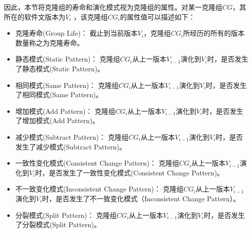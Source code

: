 因此，本节将克隆组的寿命和演化模式视为克隆组的属性。对某一克隆组$CG$，其所在的软件文版本为$V_i $ ，该克隆组{$CG_i$}的属性值可以描述如下：

\begin{itemize}
\item
克隆寿命(Group Life)：
截止到当前版本$V_ i $，克隆组$CG_i$所经历的所有的版本数量称之为克隆寿命。
\item
静态模式(Static Pattern)：
克隆组$CG_i$从上一版本$V_{i-1} $演化到$V_i $时，是否发生了静态模式(Static Pattern)。
\item
相同模式(Same Pattern)：
克隆组$CG_i$从上一版本$V_{i-1} $演化到$V_i $时，是否发生了相同模式(Same Pattern)。
\item
增加模式(Add Pattern)：
克隆组$CG_i$从上一版本$V_{i-1} $演化到$V_i $时，是否发生了增加模式(Add Pattern)。
\item
减少模式(Subtract Pattern)：
克隆组$CG_i$从上一版本$V_{i-1} $演化到$V_i $时，是否发生了减少模式(Subtract Pattern)。
\item
一致性变化模式(Consistent Change Pattern)：
克隆组$CG_i$从上一版本$V_{i-1} $演化到$V_i $时，是否发生了一致性变化模式(Consistent Change Pattern)。
\item
不一致变化模式(Inconsistent Change Pattern)：
克隆组$CG_i$从上一版本$V_{i-1} $演化到$V_ i $时，是否发生了不一致变化模式（Inconsistent Change Pattern）。
\item
分裂模式(Split Pattern)：
克隆组$CG_i$从上一版本$V_{i-1} $演化到$V_i $时，是否发生了分裂模式(Split Pattern)。
\end{itemize}

